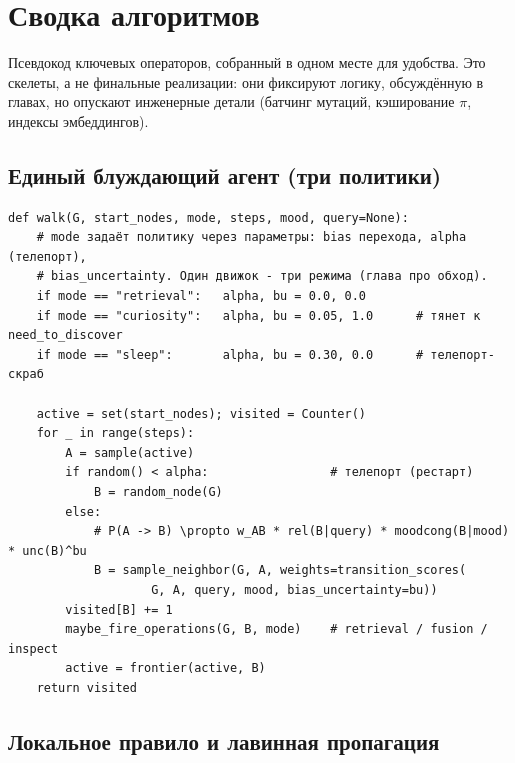 \chapter{Сводка алгоритмов}
\label{ch:algorithms}

Псевдокод ключевых операторов, собранный в одном месте для удобства. Это
скелеты, а не финальные реализации: они фиксируют логику, обсуждённую в
главах, но опускают инженерные детали (батчинг мутаций, кэширование $\pi$,
индексы эмбеддингов).

\section{Единый блуждающий агент (три политики)}

\begin{lstlisting}[style=pseudo]
def walk(G, start_nodes, mode, steps, mood, query=None):
    # mode задаёт политику через параметры: bias перехода, alpha (телепорт),
    # bias_uncertainty. Один движок - три режима (глава про обход).
    if mode == "retrieval":   alpha, bu = 0.0, 0.0
    if mode == "curiosity":   alpha, bu = 0.05, 1.0      # тянет к need_to_discover
    if mode == "sleep":       alpha, bu = 0.30, 0.0      # телепорт-скраб

    active = set(start_nodes); visited = Counter()
    for _ in range(steps):
        A = sample(active)
        if random() < alpha:                 # телепорт (рестарт)
            B = random_node(G)
        else:
            # P(A -> B) \propto w_AB * rel(B|query) * moodcong(B|mood) * unc(B)^bu
            B = sample_neighbor(G, A, weights=transition_scores(
                    G, A, query, mood, bias_uncertainty=bu))
        visited[B] += 1
        maybe_fire_operations(G, B, mode)    # retrieval / fusion / inspect
        active = frontier(active, B)
    return visited
\end{lstlisting}

\section{Локальное правило и лавинная пропагация}

